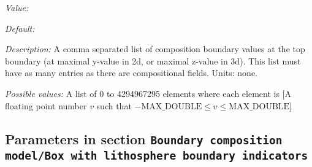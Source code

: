 \begin{itemize}
{\it Value:} 


{\it Default:} 


{\it Description:} A comma separated list of composition boundary values at the top boundary (at maximal y-value in 2d, or maximal z-value in 3d). This list must have as many entries as there are compositional fields. Units: none.


{\it Possible values:} A list of 0 to 4294967295 elements where each element is [A floating point number $v$ such that $-\text{MAX\_DOUBLE} \leq v \leq \text{MAX\_DOUBLE}$]
\end{itemize}

\subsection{Parameters in section \tt Boundary composition model/Box with lithosphere boundary indicators}
\label{parameters:Boundary_20composition_20model/Box_20with_20lithosphere_20boundary_20indicators}

